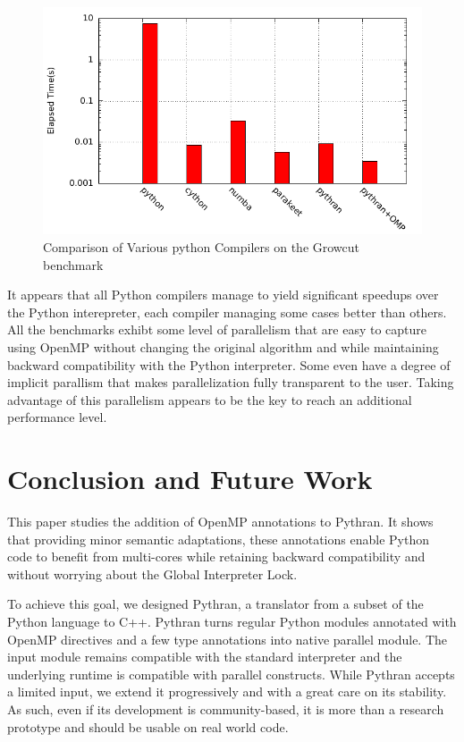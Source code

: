 \documentclass[conference]{IEEEtran}
\begin{document}
\begin{figure}[ht]
    \includegraphics[width=.5\textwidth]{growcut}
    \caption{Comparison of Various python Compilers on the Growcut benchmark}
    \label{fig:pb-growcut}
\end{figure}

It appears that all Python compilers manage to yield significant speedups over
the Python interepreter, each compiler managing some cases better than others.
All the benchmarks exhibt some level of parallelism that are easy to capture
using OpenMP without changing the original algorithm and while maintaining
backward compatibility with the Python interpreter. Some even have a degree of
implicit parallism that makes parallelization fully transparent to the user.
Taking advantage of this parallelism appears to be the key to reach an
additional performance level.


\section{Conclusion and Future Work}

This paper studies the addition of OpenMP annotations to Pythran. It shows that
providing minor semantic adaptations, these annotations enable Python code
to benefit from multi-cores while retaining backward compatibility and without
worrying about the Global Interpreter Lock.

To achieve this goal, we designed Pythran, a translator from a subset of the
Python language to C++. Pythran turns regular Python modules annotated with
OpenMP directives and a few type annotations into native parallel module. The
input module remains compatible with the standard interpreter and the underlying
runtime is compatible with parallel constructs. While Pythran accepts a limited
input, we extend it progressively and with a great care on its stability. As
such, even if its development is community-based, it is more than a research
prototype and should be usable on real world code.
\end{document}
